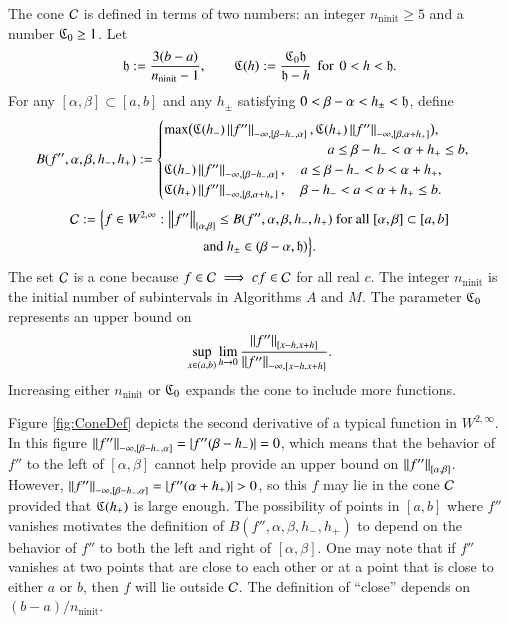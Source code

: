\documentclass[review]{elsarticle}
\theoremstyle{definition}
\renewcommand{\cw}{W}
\DeclareMathOperator{\ninit}{ninit}
\begin{document}
The cone $\cc$ is defined in terms of two numbers: an integer $n_{\ninit} \ge 5$
and a  number $\fC_0 \ge 1$. Let 
\begin{equation}
\label{hCdef}
\fh := \frac{3(b-a)}{n_{\ninit}-1}, \qquad \fC(h) := \frac{\fC_0 \fh}{\fh - h}
\mbox{\, for \,} 0<h<\fh.
\end{equation}
For any $[\alpha, \beta] \subset [a,b]$ and any $h_{\pm}$ satisfying $0 <
\beta - \alpha < h_{\pm} < \fh$, define
\begin{equation} \label{tbdef}
B(f'',\alpha,\beta,h_-,h_+) :=
\begin{cases}
   \max\bigl(\fC(h_{-}) \norm[-\infty,{[\beta-h_-,\alpha]}]{f''},\fC(h_{+})
   \norm[-\infty,{[\beta, \alpha+h_+]}]{f''}\bigr),
\\                                             \hspace{26ex} a \le \beta- h_- <  \alpha + h_+ \le b,
\\ \fC(h_{-}) \norm[-\infty,{[\beta-h_-,\alpha]}]{f''},  \quad a \le \beta- h_- < b< \alpha + h_+,
\\ \fC(h_{+}) \norm[-\infty,{[\beta, \alpha+h_+]}]{f''},
\quad \beta- h_- <  a  < \alpha + h_+ \le b.
\end{cases}
\end{equation}
\begin{multline} \label{conedef}
 \cc := \Bigl \{
 f  \in    \cw^{2,\infty}:   \norm[{[\alpha,\beta]}]{f''}  \le B(f'',\alpha,\beta,h_-,h_+)
 \text{ for all } [\alpha,\beta] \subset [a,b]
\\ \text{and } h_{\pm} \in (\beta - \alpha,  \fh)  \Bigr \}.
\end{multline}
The set $\cc$ is a cone because $f \in \cc \implies cf \in \cc$ for all real
$c$. The integer $n_{\ninit}$ is the initial number of subintervals in
Algorithms $A$ and $M$. The parameter $\fC_0$ represents an upper bound on
\[
\sup_{x \in (a,b)} \lim_{h \to 0} \frac{\norm[{[x-h,x+h]}]{f''}}{\norm[-\infty,{[x-h,x+h]}]{f''}}.
\]
 Increasing either $n_{\ninit}$ or $\fC_0$ expands the cone to
include more functions.

Figure \ref{fig:ConeDef} depicts the second derivative of a typical function in 
$\cw^{2,\infty}$.  In this figure 
$\norm[-\infty,{[\beta-h_-,\alpha]}]{f''} = \abs{f''(\beta - h_-)} = 0$, which means that the 
behavior of $f''$ to the left of $[\alpha,\beta]$ cannot help provide an upper bound on $ 
\norm[{[\alpha,\beta]}]{f''}$.  However, $\norm[-\infty,{[\beta-h_-,\alpha]}]{f''} = 
\abs{f''(\alpha + h_+)} > 0$, so this $f$ may lie in the cone $\cc$ provided that 
$\fC(h_+)$ is large enough.  The possibility of points in $[a,b]$ where $f''$ vanishes 
motivates the definition of $B(f'',\alpha,\beta,h_-,h_+)$ to depend on the behavior of $f''$ 
to both the left and right of $[\alpha,\beta]$.  One may note that if $f''$ vanishes at two 
points that are close to each other or at a point that is close to either $a$ or $b$, then 
$f$ will lie outside $\cc$.  The definition of ``close'' depends on 
$(b-a)/n_{\ninit}$.
\end{document}
